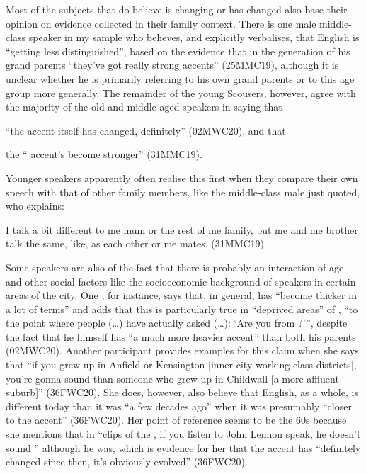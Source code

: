 Most of the subjects that do believe  is changing or has changed also base their opinion on evidence collected in their family context.
There is one male middle-class speaker in my sample who believes, and explicitly verbalises, that  English is ``getting less distinguished'', based on the evidence that in the generation of his grand parents ``they've got really strong accents'' (25MMC19), although it is unclear whether he is primarily referring to his own grand parents or to this age group more generally.
The remainder of the young Scousers, however, agree with the majority of the old and middle-aged speakers in saying that
\begin{inparaenum}[(a)]
	\item ``the accent itself has changed, definitely'' (02MWC20), and that
	\item the `` accent's become stronger'' (31MMC19).
\end{inparaenum}
Younger speakers apparently often realise this first when they compare their own speech with that of other family members, like the middle-class male just quoted, who explains:
\begin{example}
	I talk a bit different to me mum or the rest of me family, but me and me brother talk the same, like, as each other or me mates. (31MMC19)
\end{example}

Some speakers are also  of the fact that there is probably an interaction of age and other social factors like the socioeconomic background of speakers in certain areas of the city.
One , for instance, says that, in general,  has ``become thicker in a lot of terms'' and adds that this is particularly true in ``deprived areas'' of , ``to the point where people (\ldots) have actually asked (\ldots): `Are you from ?''', despite the fact that he himself has ``a much more heavier accent'' than both his parents (02MWC20).
Another participant provides examples for this claim when she says that ``if you grew up in Anfield or Kensington [inner city working-class districts], you're gonna sound  than someone who grew up in Childwall [a more affluent suburb]'' (36FWC20).
She does, however, also believe that  English, as a whole, is different today than it was ``a few decades ago'' when it was presumably ``closer to the  accent'' (36FWC20).
Her point of reference seems to be the 60s because she mentions that in ``clips of the , if you listen to John Lennon speak, he doesn't sound '' although he was, which is evidence for her that the accent has ``definitely changed since then, it's obviously evolved'' (36FWC20).

